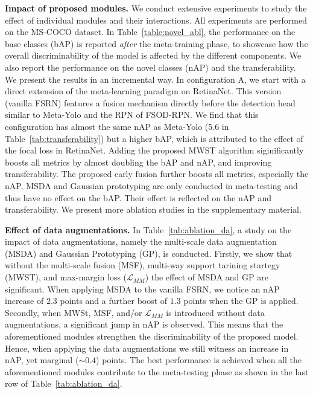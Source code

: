 \documentclass[10pt,twocolumn,letterpaper]{article}
\begin{document}
\textbf{Impact of proposed modules.} We conduct extensive experiments to study the effect of individual modules and their interactions. All experiments are performed on the MS-COCO dataset. In Table~\ref{table:novel_abl}, the performance on the base classes (bAP) is reported \textit{after} the meta-training phase, to showcase how the overall discriminability of the model is affected by the different components. We also report the performance on the novel classes (nAP) and the transferability. We present the results in an incremental way. In configuration A, we start with a direct extension of the meta-learning paradigm on RetinaNet. This version (vanilla FSRN) features a fusion mechanism directly before the detection head similar to Meta-Yolo and the RPN of FSOD-RPN. We find that this configuration has almost the same nAP as Meta-Yolo (5.6 in Table~\ref{tab:transferability}) but a higher bAP, which is attributed to the effect of the focal loss in RetinaNet. Adding the proposed MWST algorithm siginificantly boosts all metrics by almost doubling the bAP and nAP, and improving transferability. The proposed early fusion further boosts all metrics, especially the nAP. MSDA and Gaussian prototyping are only conducted in meta-testing and thus have no effect on the bAP. Their effect is reflected on the nAP and transferability. We present more ablation studies in the supplementary material.

\textbf{Effect of data augmentations.} In Table~\ref{tab:ablation_da}, a study on the impact of data augmentations, namely the multi-scale data augmentation (MSDA) and Gaussian Prototyping (GP), is conducted. Firstly, we show that without the multi-scale fusion (MSF), multi-way support tarining startegy (MWST), and max-margin loss ($\mathcal{L}_{MM}$) the effect of MSDA and GP are significant. When applying MSDA to the vanilla FSRN, we notice an nAP increase of $2.3$ points and a further boost of $1.3$ points when the GP is applied. Secondly, when MWSt, MSF, and/or $\mathcal{L}_{MM}$ is introduced without data augmentations, a significant jump in nAP is observed. This means that the aforementioned modules strengthen the discriminability of the proposed model. Hence, when applying the data augmentations we still witness an increase in nAP, yet marginal ($\sim 0.4$) points. The best performance is achieved when all the aforementioned modules contribute to the meta-testing phase as shown in the last row of Table~\ref{tab:ablation_da}. 
\end{document}
